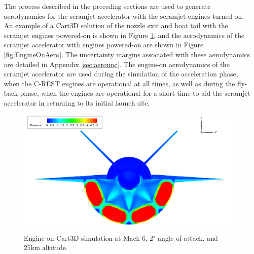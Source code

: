 The process described in the preceding sections are used to generate aerodynamics for the scramjet accelerator with the scramjet engines turned on. An example of a Cart3D solution of the nozzle exit and boat tail with the scramjet engines powered-on is shown in Figure \ref{fig:EngineOn}, and the aerodynamics of the scramjet accelerator with engines powered-on are shown in Figure \ref{fig:EngineOnAero}. The uncertainty margins associated with these aerodynamics are detailed in Appendix \ref{sec:aerounc}.
		The engine-on aerodynamics of the scramjet accelerator are used during the simulation of the acceleration phase, when the C-REST engines are operational at all times, as well as during the fly-back phase, when the engines are operational for a short time to aid the scramjet accelerator in returning to its initial launch site.
		
		
		\begin{figure}[ht]
			\centering
			\includegraphics[width=0.9\linewidth]{figures/3_vehicle_design/EngineOn}
			\caption{Engine-on Cart3D simulation at Mach 6, 2$^\circ$ angle of attack, and 25km altitude.}
			\label{fig:EngineOn}
		\end{figure}
		
